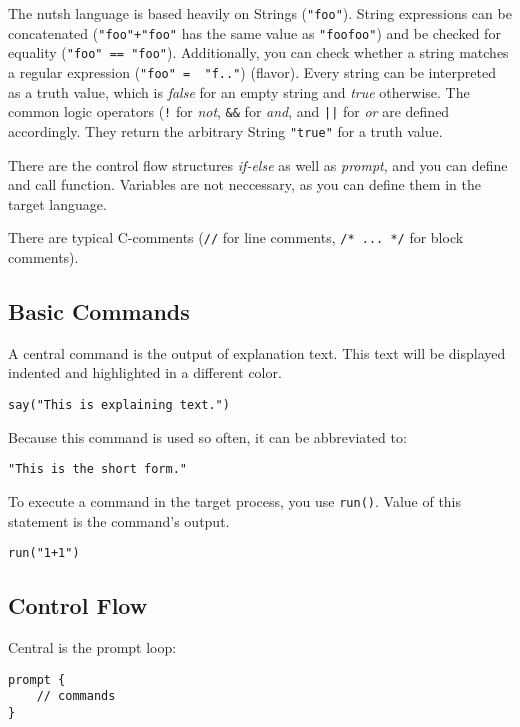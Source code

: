 \documentclass[twoside]{scrreprt}
\begin{document}
The nutsh language is based heavily on Strings (\texttt{"foo"}). String expressions can be concatenated (\texttt{"foo"+"foo"} has the same value as \texttt{"foofoo"}) and be checked for equality (\texttt{"foo" == "foo"}). Additionally, you can check whether a string matches a regular expression (\texttt{"foo" =~ "f.."}) (flavor). Every string can be interpreted as a truth value, which is \emph{false} for an empty string and \emph{true} otherwise. The common logic operators (\texttt{!} for \emph{not}, \texttt{\&\&} for \emph{and}, and \texttt{||} for \emph{or} are defined accordingly. They return the arbitrary String \texttt{"true"} for a truth value.

There are the control flow structures \emph{if-else} as well as \emph{prompt}, and you can define and call function. Variables are not neccessary, as you can define them in the target language.

There are typical C-comments (\texttt{//} for line comments, \texttt{/* ... */} for block comments).

\subsection{Basic Commands}

A central command is the output of explanation text. This text will be displayed indented and highlighted in a different color.

\begin{lstlisting}
say("This is explaining text.")
\end{lstlisting}

Because this command is used so often, it can be abbreviated to:

\begin{lstlisting}
"This is the short form."
\end{lstlisting}

To execute a command in the target process, you use \texttt{run()}. Value of this statement is the command's output.

\begin{lstlisting}
run("1+1")
\end{lstlisting}

\subsection{Control Flow}

Central is the prompt loop:

\begin{lstlisting}
prompt {
    // commands
}
\end{lstlisting}
\end{document}
